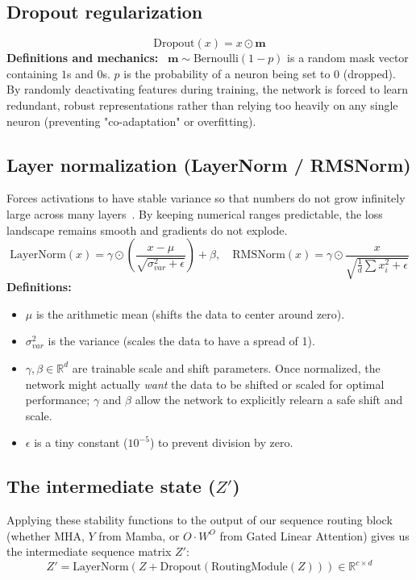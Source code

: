 \documentclass[11pt]{article}
\begin{document}
	\subsection{Dropout regularization}
	\begin{equation}
		\text{Dropout}(x) = x \odot \mathbf{m}
	\end{equation}
	\textbf{Definitions and mechanics:}~\cite{srivastava2014dropout} 
	$\mathbf{m} \sim \text{Bernoulli}(1-p)$ is a random mask vector containing $1$s and $0$s.
	$p$ is the probability of a neuron being set to $0$ (dropped).
	By randomly deactivating features during training, the network is forced to learn redundant, robust representations rather than relying too heavily on any single neuron (preventing "co-adaptation" or overfitting).
	
	\subsection{Layer normalization (LayerNorm / RMSNorm)}
	Forces activations to have stable variance so that numbers do not grow infinitely large across many layers~\cite{ba2016layernorm, zhang2019rmsnorm}.
	By keeping numerical ranges predictable, the loss landscape remains smooth and gradients do not explode.
	\begin{equation}
		\text{LayerNorm}(x) = \gamma \odot \left( \frac{x - \mu}{\sqrt{\sigma_{var}^2 + \epsilon}} \right) + \beta, \quad \text{RMSNorm}(x) = \gamma \odot \frac{x}{\sqrt{\frac{1}{d} \sum x_i^2 + \epsilon}}
	\end{equation}
	\textbf{Definitions:} 
	\begin{itemize}
		\item $\mu$ is the arithmetic mean (shifts the data to center around zero).
		\item $\sigma_{var}^2$ is the variance (scales the data to have a spread of 1).
		\item $\gamma, \beta \in \mathbb{R}^d$ are trainable scale and shift parameters.
		Once normalized, the network might actually \textit{want} the data to be shifted or scaled for optimal performance;
		$\gamma$ and $\beta$ allow the network to explicitly relearn a safe shift and scale.
		\item $\epsilon$ is a tiny constant ($10^{-5}$) to prevent division by zero.
	\end{itemize}
	
	\subsection{The intermediate state ($Z'$)}
	Applying these stability functions to the output of our sequence routing block (whether MHA, $Y$ from Mamba, or $O \cdot W^O$ from Gated Linear Attention) gives us the intermediate sequence matrix $Z'$:
	\begin{equation}
		Z' = \text{LayerNorm}(Z + \text{Dropout}(\text{RoutingModule}(Z))) \in \mathbb{R}^{c \times d}
	\end{equation}
	
\end{document}

